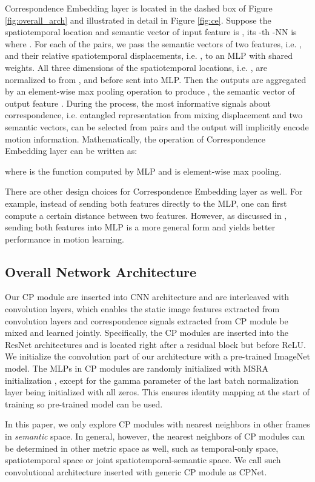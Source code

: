 \documentclass[10pt,twocolumn,letterpaper]{article}
\begin{document}
Correspondence Embedding layer is located in the dashed box of Figure \ref{fig:overall_arch} and illustrated in detail in Figure \ref{fig:ce}. Suppose the spatiotemporal location and semantic vector of input feature  is , its -th -NN is  where . For each of the  pairs, we pass the semantic vectors of two features, i.e. , and their relative spatiotemporal displacements, i.e. , to an MLP with shared weights. All three dimensions of the spatiotemporal locations, i.e. , are normalized to  from ,  and  before sent into MLP.  Then the  outputs are aggregated by an element-wise max pooling operation to produce , the semantic vector of output feature . During the process, the most informative signals about correspondence, i.e. entangled representation from mixing displacement and two semantic vectors, can be selected from  pairs and the output will implicitly encode motion information. Mathematically, the operation of Correspondence Embedding layer can be written as:

where  is the function computed by MLP and  is element-wise max pooling.

There are other design choices for Correspondence Embedding layer as well. For example, instead of sending both features directly to the MLP, one can first compute a certain distance between two features. 
However, as discussed in \cite{FlowNet3D}, sending both features into MLP is a more general form and yields better performance in motion learning.

\subsection{Overall Network Architecture}

Our CP module are inserted into CNN architecture and are interleaved with convolution layers, which enables the static image features extracted from convolution layers and correspondence signals extracted from CP module be mixed and learned jointly. 
Specifically, the CP modules are inserted into the ResNet \cite{ResNet} architectures and is located right after a residual block but before ReLU. 
We initialize the convolution part of our architecture with a pre-trained ImageNet model. The MLPs in CP modules are randomly initialized with MSRA initialization \cite{MSRA:init}, except for the gamma parameter of the last batch normalization layer \cite{batchnorm} being initialized with all zeros. This ensures identity mapping at the start of training so pre-trained model can be used.

In this paper, we only explore CP modules with  nearest neighbors in other frames in  \textit{semantic} space.
In general, however, the nearest neighbors of CP modules can be determined in other metric space as well, such as temporal-only space, spatiotemporal space or joint spatiotemporal-semantic space. We call such convolutional architecture inserted with generic CP module as CPNet. 
\end{document}
